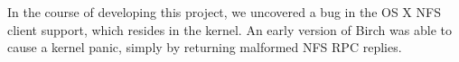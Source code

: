 \documentclass{article}
\begin{document}
In the course of developing this project, we uncovered a bug in the OS
X NFS client support, which resides in the kernel. An early version of
Birch was able to cause a kernel panic, simply by returning malformed
NFS RPC replies.



\vfill
\begin{center}
\end{center}
\vfill
\end{document}

